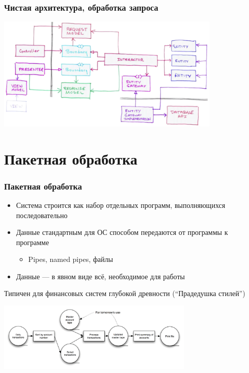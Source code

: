 \documentclass{../cscslides}
\begin{document}
    \begin{frame}
        \frametitle{Чистая архитектура, обработка запроса}
        \begin{center}
            \includegraphics[width=0.8\textwidth]{cleanArchitectureControlFlow.png}
        \end{center}
    \end{frame}

    \section{Пакетная обработка}

    \begin{frame}
        \frametitle{Пакетная обработка}
        \begin{itemize}
            \item Система строится как набор отдельных программ, выполняющихся последовательно
            \item Данные стандартным для ОС способом передаются от программы к программе
            \begin{itemize}
                \item Pipes, named pipes, файлы
            \end{itemize}
            \item Данные --- в явном виде всё, необходимое для работы
        \end{itemize}
        Типичен для финансовых систем глубокой древности (``Прадедушка стилей'')
        \begin{center}
            \includegraphics[width=0.7\textwidth]{batch.png}
        \end{center}
    \end{frame}
\end{document}
